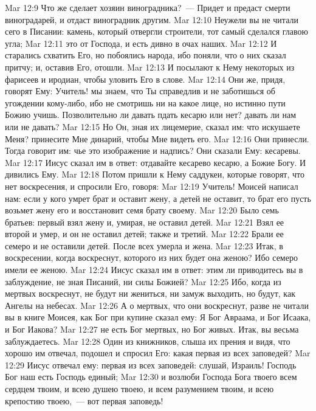\vs Mar 12:9 Что же сделает хозяин виноградника?~--- Придет и предаст смерти виноградарей, и отдаст виноградник другим.
\vs Mar 12:10 Неужели вы не читали сего в Писании: камень, который отвергли строители, тот самый сделался главою угла;
\vs Mar 12:11 это от Господа, и есть дивно в очах наших.
\vs Mar 12:12 И старались схватить Его, но побоялись народа, ибо поняли, что о них сказал притчу; и, оставив Его, отошли.
\rsbpar\vs Mar 12:13 И посылают к Нему некоторых из фарисеев и иродиан, чтобы уловить Его в слове.
\vs Mar 12:14 Они же, придя, говорят Ему: Учитель! мы знаем, что Ты справедлив и не заботишься об угождении кому-либо, ибо не смотришь ни на какое лице, но истинно пути Божию учишь. Позволительно ли давать пдать кесарю или нет? давать ли нам или не давать?
\vs Mar 12:15 Но Он, зная их лицемерие, сказал им: что искушаете Меня? принесите Мне динарий, чтобы Мне видеть его.
\vs Mar 12:16 Они принесли. Тогда говорит им: чье это изображение и надпись? Они сказали Ему: кесаревы.
\vs Mar 12:17 Иисус сказал им в ответ: отдавайте кесарево кесарю, а Божие Богу. И дивились Ему.
\rsbpar\vs Mar 12:18 Потом пришли к Нему саддукеи, которые говорят, что нет воскресения, и спросили Его, говоря:
\vs Mar 12:19 Учитель! Моисей написал нам: если у кого умрет брат и оставит жену, а детей не оставит, то брат его пусть возьмет жену его и восстановит семя брату своему.
\vs Mar 12:20 Было семь братьев: первый взял жену и, умирая, не оставил детей.
\vs Mar 12:21 Взял ее второй и умер, и он не оставил детей; также и третий.
\vs Mar 12:22 Брали ее  семеро и не оставили детей. После всех умерла и жена.
\vs Mar 12:23 Итак, в воскресении, когда воскреснут, которого из них будет она женою? Ибо семеро имели ее женою.
\vs Mar 12:24 Иисус сказал им в ответ: этим ли приводитесь вы в заблуждение, не зная Писаний, ни силы Божией?
\vs Mar 12:25 Ибо, когда из мертвых воскреснут,  не будут ни жениться, ни замуж выходить, но будут, как Ангелы на небесах.
\vs Mar 12:26 А о мертвых, что они воскреснут, разве не читали вы в книге Моисея, как Бог при купине сказал ему: Я Бог Авраама, и Бог Исаака, и Бог Иакова?
\vs Mar 12:27  не есть Бог мертвых, но Бог живых. Итак, вы весьма заблуждаетесь.
\rsbpar\vs Mar 12:28 Один из книжников, слыша их прения и видя, что  хорошо им отвечал, подошел и спросил Его: какая первая из всех заповедей?
\vs Mar 12:29 Иисус отвечал ему: первая из всех заповедей: слушай, Израиль! Господь Бог наш есть Господь единый;
\vs Mar 12:30 и возлюби Господа Бога твоего всем сердцем твоим, и всею душею твоею, и всем разумением твоим, и всею крепостию твоею,~--- вот первая заповедь!
